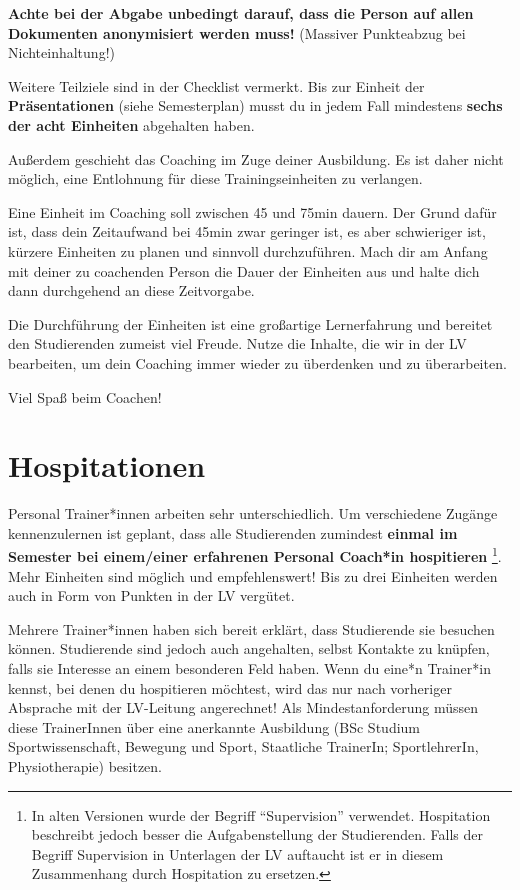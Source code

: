 \documentclass[
  letterpaper,
  DIV=11,
  numbers=noendperiod]{scrreprt}
\begin{document}
\textbf{Achte bei der Abgabe unbedingt darauf, dass die Person auf allen
Dokumenten anonymisiert werden muss!} (Massiver Punkteabzug bei
Nichteinhaltung!)

Weitere Teilziele sind in der Checklist vermerkt. Bis zur Einheit der
\textbf{Präsentationen} (siehe Semesterplan) musst du in jedem Fall
mindestens \textbf{sechs der acht Einheiten} abgehalten haben.

Außerdem geschieht das Coaching im Zuge deiner Ausbildung. Es ist daher
nicht möglich, eine Entlohnung für diese Trainingseinheiten zu
verlangen.

Eine Einheit im Coaching soll zwischen 45 und 75min dauern. Der Grund
dafür ist, dass dein Zeitaufwand bei 45min zwar geringer ist, es aber
schwieriger ist, kürzere Einheiten zu planen und sinnvoll durchzuführen.
Mach dir am Anfang mit deiner zu coachenden Person die Dauer der
Einheiten aus und halte dich dann durchgehend an diese Zeitvorgabe.

Die Durchführung der Einheiten ist eine großartige Lernerfahrung und
bereitet den Studierenden zumeist viel Freude. Nutze die Inhalte, die
wir in der LV bearbeiten, um dein Coaching immer wieder zu überdenken
und zu überarbeiten.

Viel Spaß beim Coachen!

\section{Hospitationen}\label{sec-supervisionsstunden}

Personal Trainer*innen arbeiten sehr unterschiedlich. Um verschiedene
Zugänge kennenzulernen ist geplant, dass alle Studierenden zumindest
\textbf{einmal im Semester bei einem/einer erfahrenen Personal Coach*in
hospitieren} \footnote{In alten Versionen wurde der Begriff
  ``Supervision'' verwendet. Hospitation beschreibt jedoch besser die
  Aufgabenstellung der Studierenden. Falls der Begriff Supervision in
  Unterlagen der LV auftaucht ist er in diesem Zusammenhang durch
  Hospitation zu ersetzen.}. Mehr Einheiten sind möglich und
empfehlenswert! Bis zu drei Einheiten werden auch in Form von Punkten in
der LV vergütet.

Mehrere Trainer*innen haben sich bereit erklärt, dass Studierende sie
besuchen können. Studierende sind jedoch auch angehalten, selbst
Kontakte zu knüpfen, falls sie Interesse an einem besonderen Feld haben.
Wenn du eine*n Trainer*in kennst, bei denen du hospitieren möchtest,
wird das nur nach vorheriger Absprache mit der LV-Leitung angerechnet!
Als Mindestanforderung müssen diese TrainerInnen über eine anerkannte
Ausbildung (BSc Studium Sportwissenschaft, Bewegung und Sport,
Staatliche TrainerIn; SportlehrerIn, Physiotherapie) besitzen.
\end{document}
